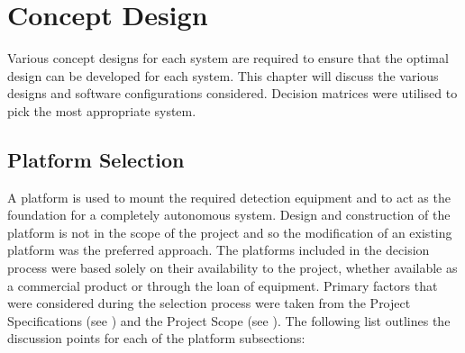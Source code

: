 \documentclass[main.tex]{subfiles}
\begin{document}
\chapter{Concept Design}
Various concept designs for each system are required to ensure that the optimal design can be developed for each system. This chapter will discuss the various designs and software configurations considered. Decision matrices were utilised to pick the most appropriate system.
\section{Platform Selection}
A platform is used to mount the required detection equipment and to act as the foundation for a completely autonomous system.  Design and construction of the platform is not in the scope of the project and so the modification of an existing platform was the preferred approach. The platforms included in the decision process were based solely on their availability to the project, whether available as a commercial product or through the loan of equipment. Primary factors that were considered during the selection process were taken from the Project Specifications (see ) and the Project Scope (see ). The following list outlines the discussion points for each of the platform subsections:
\end{document}
